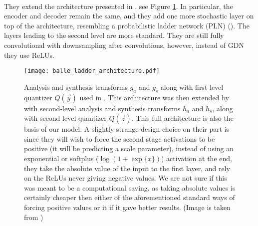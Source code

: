 \paragraph{\cite{balle2018variational}} They extend the architecture presented in
\cite{balle2016end}, see Figure \ref{fig:balle_ladder_arch}.
In particular, the encoder and decoder remain the same,
and they add one more stochastic layer on top of the architecture,
resembling a probabilistic ladder network (PLN) (\cite{sonderby2016train}).
The layers leading to the second level are more standard. They are still fully
convolutional with downsampling after convolutions, however, instead of GDN
they use ReLUs.
\par

\begin{figure}
  \centering 
  \texttt{[image: balle\_ladder\_architecture.pdf]}
  \caption[Architecture used by \cite{balle2018variational}.]
  {Analysis and synthesis transforms $g_a$ and $g_s$ along with first
    level quantizer $Q(\vec{y})$ used in \cite{balle2016end}. This architecture
    was then extended by \cite{balle2018variational} with second-level analysis
    and synthesis transforms $h_a$ and $h_s$, along with second level quantizer
    $Q(\vec{z})$. This full architecture is also the basis of our model. A
    slightly strange design choice on their part is since they will wish to
    force the second stage activations to be positive (it will be predicting
    a scale parameter), instead of using an exponential or softplus
    ($\log (1 + \exp\{x\})$) activation at the end, they take the absolute value
    of the input to the first layer, and rely on the ReLUs never giving negative
    values. We are not sure if this was meant to be a computational saving, as
    taking absolute values is certainly cheaper then either of the
    aforementioned standard ways of forcing positive values or it if it gave
    better results.
    (Image is taken from \cite{balle2018variational})}
  \label{fig:balle_ladder_arch}
\end{figure}

